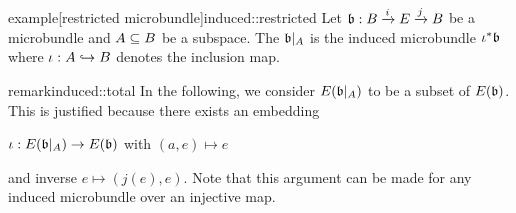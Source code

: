\begin{mystatement}{example}[restricted microbundle]{induced::restricted}    
    Let $\bundledef{\bb}{B}{E}{i}{j}$ be a microbundle and $A \subseteq{} B$ be a subspace.
    The  $\bb[A]$ is the induced microbundle $\ind{\iota}\bb$
    where $\iota: A \hookrightarrow{} B$ denotes the inclusion map.
\end{mystatement}

\begin{mystatement}{remark}{induced::total}
    In the following, we consider $E(\bb[A])$ to be a subset of $E(\bb)$.
    This is justified because there exists an embedding
    \begin{center}
        $\iota: E(\bb[A]) \to E(\bb)$ with $(a, e) \mapsto e$
    \end{center}
    and inverse $e \mapsto (j(e), e)$.
    Note that this argument can be made for any induced microbundle over an injective map.
\end{mystatement}